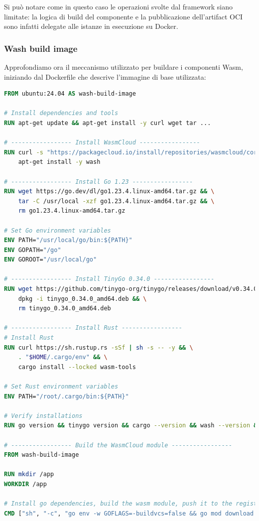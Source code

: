 Si può notare come in questo caso le operazioni svolte dal framework siano limitate: la logica di build del componente e la pubblicazione dell'artifact OCI sono infatti delegate alle istanze in esecuzione su Docker.
    
\subsubsection{Wash build image}

Approfondiamo ora il meccanismo utilizzato per buildare i componenti Wasm, iniziando dal Dockerfile che descrive l'immagine di base utilizzata:

\begin{lstlisting}[language=Dockerfile, caption={wash-build-image Dockerfile}, captionpos=b, label={code:wash_buil_image_dockerfile}, basicstyle=\ttfamily\small]
FROM ubuntu:24.04 AS wash-build-image

# Install dependencies and tools
RUN apt-get update && apt-get install -y curl wget tar ...

# ----------------- Install WasmCloud -----------------
RUN curl -s "https://packagecloud.io/install/repositories/wasmcloud/core/script.deb.sh" | bash && \
    apt-get install -y wash

# ----------------- Install Go 1.23 -----------------    
RUN wget https://go.dev/dl/go1.23.4.linux-amd64.tar.gz && \
    tar -C /usr/local -xzf go1.23.4.linux-amd64.tar.gz && \
    rm go1.23.4.linux-amd64.tar.gz

# Set Go environment variables
ENV PATH="/usr/local/go/bin:${PATH}"
ENV GOPATH="/go"
ENV GOROOT="/usr/local/go"

# ----------------- Install TinyGo 0.34.0 -----------------
RUN wget https://github.com/tinygo-org/tinygo/releases/download/v0.34.0/tinygo_0.34.0_amd64.deb && \
    dpkg -i tinygo_0.34.0_amd64.deb && \
    rm tinygo_0.34.0_amd64.deb

# ----------------- Install Rust -----------------
# Install Rust
RUN curl https://sh.rustup.rs -sSf | sh -s -- -y && \
    . "$HOME/.cargo/env" && \
    cargo install --locked wasm-tools

# Set Rust environment variables
ENV PATH="/root/.cargo/bin:${PATH}"

# Verify installations
RUN go version && tinygo version && cargo --version && wash --version && wasm-tools --version

# ----------------- Build the WasmCloud module -----------------
FROM wash-build-image

RUN mkdir /app
WORKDIR /app

# Install go dependencies, build the wasm module, push it to the registry
CMD ["sh", "-c", "go env -w GOFLAGS=-buildvcs=false && go mod download && go mod verify && wash build && wash push $REGISTRY build/*.wasm && chown -R ${HOST_UID}:${HOST_GID} ."]
\end{lstlisting}

